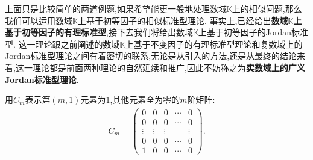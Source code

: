 \documentclass[../../main.tex]{subfiles}
\begin{document}
上面只是比较简单的两道例题,如果希望能更一般地处理数域$\mathbb{K}$上的相似问题,那么我们可以运用数域$\mathbb{K}$上基于初等因子的相似标准型理论. 事实上,已经给出\textbf{数域$\mathbb{K}$上基于初等因子的有理标准型},接下去我们将给出数域$\mathbb{K}$上基于初等因子的Jordan标准型. 这一理论跟之前阐述的数域$\mathbb{K}$上基于不变因子的有理标准型理论和复数域上的Jordan标准型理论之间有着密切的联系,无论是从引入的方法,还是从最终的结论来看,这一理论都是前面两种理论的自然延续和推广,因此不妨称之为\textbf{实数域上的广义Jordan标准型理论}. 

\vspace{0.5cm}

\begin{definition}
用$C_m$表示第$(m,1)$元素为$1$,其他元素全为零的$m$阶矩阵:
\begin{align*}
C_m = 
\begin{pmatrix}
0 & 0 & 0 & \cdots & 0 \\
0 & 0 & 0 & \cdots & 0 \\
\vdots & \vdots & \vdots & & \vdots \\
0 & 0 & 0 & \cdots & 0 \\
1 & 0 & 0 & \cdots & 0
\end{pmatrix}.
\end{align*}
\end{definition}
\end{document}

